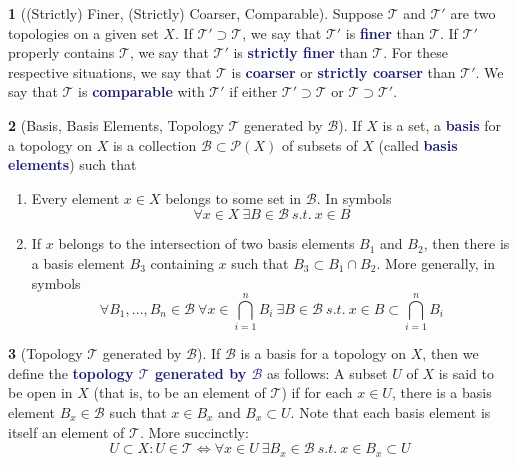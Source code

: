 \documentclass[11pt]{article}
\numberwithin{equation}{section}
\newcommand{\navy}[1]{\textcolor{MidnightBlue}{\bf #1}}
\theoremstyle{plain}
\theoremstyle{definition}
\newtheorem{definition}{\color{MidnightBlue}{\textbf{Definition}}}[section]
\def\ss{\subset}
\newcommand{\1}{\mathbbm 1}
\newcommand{\pP}{\mathcal P}
\newcommand{\tT}{\mathcal T}
\newcommand{\bB}{\mathcal B}
\begin{document}
\begin{definition}[(Strictly) Finer, (Strictly) Coarser, Comparable]
Suppose $\tT$ and $\tT'$ are two topologies on a given set $X$. If $\tT' \supset \tT$, we say that $\tT'$ is \navy{finer} than $\tT$. If $\tT'$ properly contains $\tT$, we say that $\tT'$ is \navy{strictly finer} than $\tT$. For these respective situations, we say that $\tT$ is \navy{coarser} or \navy{strictly coarser} than $\tT'$. We say that $\tT$ is \navy{comparable} with $\tT'$ if either $\tT' \supset \tT$ or $\tT \supset \tT'$.
\end{definition}

\begin{definition}[Basis, Basis Elements, Topology $\tT$ generated by $\bB$]
If $X$ is a set, a \navy{basis} for a topology on $X$ is a collection $\bB \ss \pP(X)$ of subsets of $X$ (called \navy{basis elements}) such that
\begin{enumerate}
\item Every element $x \in X$ belongs to some set in $\bB$. In symbols
\begin{equation}
\forall x \in X \ \exists B \in \bB \ s.t. \ x \in B
\end{equation}
\item If $x$ belongs to the intersection of two basis elements $B_1$ and $B_2$, then there is a basis element $B_3$ containing $x$ such that $B_3 \subset B_1 \cap B_2$. More generally, in symbols
\begin{equation}
\forall B_1,\ldots,B_n \in \bB \ \forall x \in \bigcap_{i=1}^n B_i \ \exists B \in \bB \ s.t. \ x \in B \ss \bigcap_{i=1}^n B_i
\end{equation}
\end{enumerate}
\end{definition}

\begin{definition}[Topology $\tT$ generated by $\bB$]
If $\bB$ is a basis for a topology on $X$, then we define the \navy{topology $\tT$ generated by $\bB$} as follows: A subset $U$ of $X$ is said to be open in $X$ (that is, to be an element of $\tT$) if for each $x \in U$, there is a basis element $B_x \in \bB$ such that $x \in B_x$ and $B_x \subset U$. Note that each basis element is itself an element of $\tT$. More succinctly:
\begin{equation*}
U \ss X: U \in \tT \iff \forall x\in U \ \exists B_x \in \bB \ s.t. \ x \in B_x \ss U
\end{equation*}

\end{definition}
\end{document}
